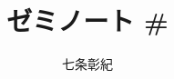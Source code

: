 \documentclass[a4paper]{jsarticle}
\begin{document}
\title{ゼミノート \#}
\author{七条彰紀}
\maketitle



\end{document}

